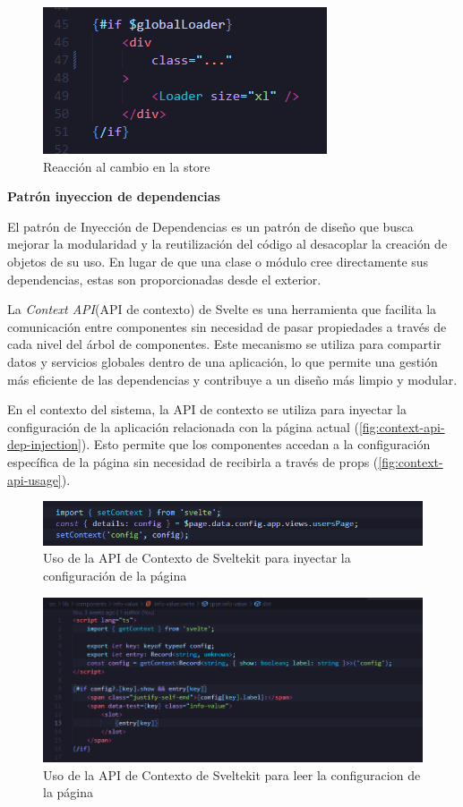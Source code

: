 \begin{figure}[H]
    \centering
    \includegraphics{images/code/loader-store-reaction.png}
    \caption{Reacción al cambio en la store}
    \label{fig:loader-store-reaction}
\end{figure}

\textbf{Patrón inyeccion de dependencias}

El patrón de Inyección de Dependencias es un patrón de diseño que busca mejorar la modularidad y la reutilización del código al desacoplar la creación de objetos de su uso. En lugar de que una clase o módulo cree directamente sus dependencias, estas son proporcionadas desde el exterior.

La \textit{Context API}(API de contexto) de Svelte es una herramienta que facilita la comunicación entre componentes sin necesidad de pasar propiedades a través de cada nivel del árbol de componentes. Este mecanismo se utiliza para compartir datos y servicios globales dentro de una aplicación, lo que permite una gestión más eficiente de las dependencias y contribuye a un diseño más limpio y modular.

En el contexto del sistema, la API de contexto se utiliza para inyectar la configuración de la aplicación relacionada con la página actual (\autoref{fig:context-api-dep-injection}). Esto permite que los componentes accedan a la configuración específica de la página sin necesidad de recibirla a través de props (\autoref{fig:context-api-usage}).

\begin{figure}[H]
    \centering
    \includegraphics[width=\linewidth]{images/code/context-api-dep-injection.png}
    \caption{Uso de la API de Contexto de Sveltekit para inyectar la configuración de la página}
    \label{fig:context-api-dep-injection}
\end{figure}

\begin{figure}[H]
    \centering
    \includegraphics[width=\linewidth]{images/code/context-api-usage.png}
    \caption{Uso de la API de Contexto de Sveltekit para leer la configuracion de la página}
    \label{fig:context-api-usage}
\end{figure}